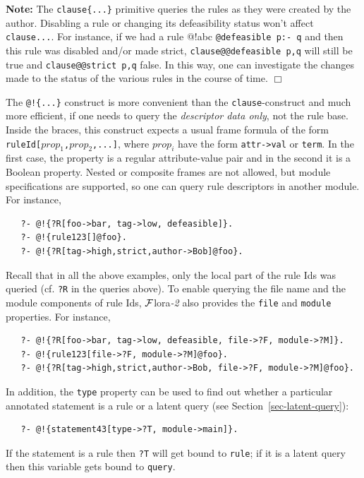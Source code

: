 \documentclass[11pt]{article}
\newcommand{\FLSYSTEM}{{\mbox{\sc ${\cal F}${lora}\rm\emph{-2}}}\xspace}
\begin{document}
\noindent
\textbf{Note:} The \texttt{clause\{...\}} primitive queries the rules as
they were created by the author. Disabling a rule or changing its
defeasibility status won't affect \texttt{clause{...}}.
For instance, if we had a
rule @!{abc} \texttt{@{defeasible} p:- q}
and then this rule was disabled and/or
made strict, \texttt{clause{@@{defeasible} p,q}}
will still be true and
\texttt{clause{@@{strict} p,q}} 
false. In this way, one can investigate the changes
made to the status of the various rules in the course of time.   
\hfill $\Box$

The \texttt{@!\{...\}} construct is more convenient than the
\texttt{clause}-construct and much more efficient,
if one needs to query the \emph{descriptor data
  only}, not the rule base. Inside the braces, this construct expects a
usual frame formula of the form \texttt{ruleId[$prop_1$,$prop_2$,...]}, where
$prop_i$ have the form \texttt{attr->val} or \texttt{term}. In the first
case, the property is a regular attribute-value pair and in the second it
is a Boolean property. Nested or composite frames are not allowed, but
module specifications are supported, so one can query rule descriptors in
another module. For instance,
\begin{verbatim}
   ?- @!{?R[foo->bar, tag->low, defeasible]}.
   ?- @!{rule123[]@foo}.
   ?- @!{?R[tag->high,strict,author->Bob]@foo}.
\end{verbatim}
Recall that in all the above examples, only the local part of the rule Ids was
queried (cf. \texttt{?R} in the queries above). To enable querying the file
name and the module components of rule Ids, \FLSYSTEM also provides the
\texttt{file} and \texttt{module} properties. For instance,
\begin{verbatim}
   ?- @!{?R[foo->bar, tag->low, defeasible, file->?F, module->?M]}.
   ?- @!{rule123[file->?F, module->?M]@foo}.
   ?- @!{?R[tag->high,strict,author->Bob, file->?F, module->?M]@foo}.
\end{verbatim}
In addition, the \texttt{type}  property can be used to find out whether a particular
annotated statement is a rule or a latent query (see
Section~\ref{sec-latent-query}):
\begin{verbatim}
   ?- @!{statement43[type->?T, module->main]}.
\end{verbatim}
If the statement is a rule then \texttt{?T} will get bound to
\texttt{rule}; if it is a latent query then this variable gets
bound to \texttt{query}. 
\end{document}
